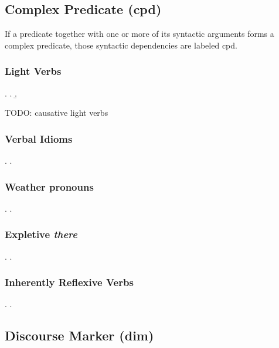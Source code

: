 \documentclass[a4paper]{article}
\begin{document}
\clearpage
\subsection{Complex Predicate (\textsf{cpd})}
\label{sec:cpd}

If a predicate together with one or more of its syntactic arguments forms a
complex predicate, those syntactic dependencies are labeled \textsf{cpd}.

\subsubsection{Light Verbs}

\ex.
\a. 
\b. 

TODO: causative light verbs

\subsubsection{Verbal Idioms}

\ex.
\a. 

\subsubsection{Weather pronouns}

\ex.
\a. 

\subsubsection{Expletive \emph{there}}

\ex.
\a. 

\subsubsection{Inherently Reflexive Verbs}

\ex.
\a. 



\clearpage
\subsection{Discourse Marker (\textsf{dim})}
\label{sec:dim}
\end{document}
